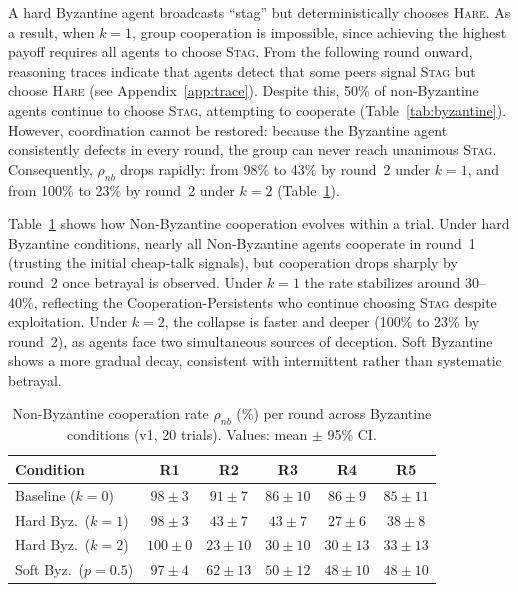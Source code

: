 \documentclass[runningheads]{llncs}
\newcommand{\tsc}[1]{\textsc{#1}}
\begin{document}
A hard Byzantine agent broadcasts ``stag'' but deterministically chooses \tsc{Hare}. As a result, when $k{=}1$, group cooperation is impossible, since achieving the highest payoff requires all agents to choose \tsc{Stag}. From the following round onward, reasoning traces indicate that agents detect that some peers signal \tsc{Stag} but choose \tsc{Hare} (see Appendix~\ref{app:trace}). Despite this, 50\% of non-Byzantine agents continue to choose \tsc{Stag}, attempting to cooperate (Table~\ref{tab:byzantine}). However, coordination cannot be restored: because the Byzantine agent consistently defects in every round, the group can never reach unanimous \tsc{Stag}. Consequently, $\rho_{nb}$ drops rapidly: from 98\% to 43\% by round~2 under $k{=}1$, and from 100\% to 23\% by round~2 under $k{=}2$ (Table~\ref{tab:roundbyround}).

Table~\ref{tab:roundbyround} shows how Non-Byzantine cooperation evolves within a trial. Under hard Byzantine conditions, nearly all Non-Byzantine agents cooperate in round~1 (trusting the initial cheap-talk signals), but cooperation drops sharply by round~2 once betrayal is observed. Under $k{=}1$ the rate stabilizes around 30--40\%, reflecting the Cooperation-Persistents who continue choosing \tsc{Stag} despite exploitation. Under $k{=}2$, the collapse is faster and deeper (100\% to 23\% by round~2), as agents face two simultaneous sources of deception. Soft Byzantine shows a more gradual decay, consistent with intermittent rather than systematic betrayal.

\begin{table}[h]
\centering
\caption{Non-Byzantine cooperation rate $\rho_{nb}$ (\%) per round across Byzantine conditions (v1, 20 trials). Values: mean $\pm$ 95\% CI.}\label{tab:roundbyround}
\smallskip
\footnotesize
\begin{tabular}{@{}lccccc@{}}
\toprule
Condition & R1 & R2 & R3 & R4 & R5 \\
\midrule
Baseline ($k{=}0$)     & $98{\pm}3$  & $91{\pm}7$  & $86{\pm}10$ & $86{\pm}9$  & $85{\pm}11$ \\
Hard Byz.\ ($k{=}1$)   & $98{\pm}3$  & $43{\pm}7$  & $43{\pm}7$  & $27{\pm}6$  & $38{\pm}8$ \\
Hard Byz.\ ($k{=}2$)   & $100{\pm}0$ & $23{\pm}10$ & $30{\pm}10$ & $30{\pm}13$ & $33{\pm}13$ \\
Soft Byz.\ ($p{=}0.5$) & $97{\pm}4$  & $62{\pm}13$ & $50{\pm}12$ & $48{\pm}10$ & $48{\pm}10$ \\
\bottomrule
\end{tabular}
\end{table}
\end{document}
